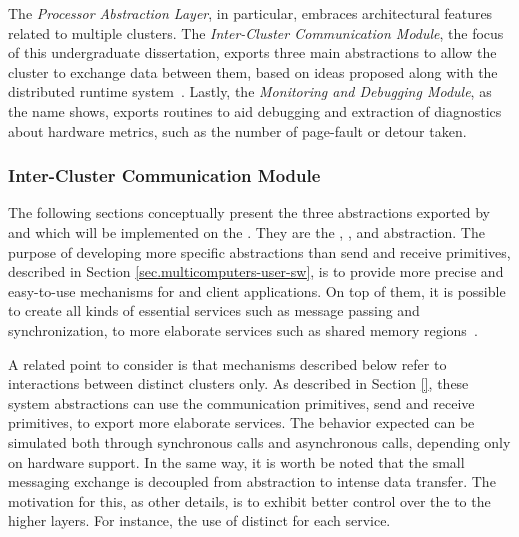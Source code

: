 		The \textit{Processor Abstraction Layer}, in particular, embraces
		architectural features related to multiple clusters.
		The \textit{Inter-Cluster Communication Module}, the focus of
		this undergraduate dissertation, exports three main abstractions to allow the
		cluster to exchange data between them, based on ideas proposed along with the
		\nodeos distributed runtime system~\cite{DeDinechin2013-1}.
		Lastly, the \textit{Monitoring and Debugging Module}, as the
		name shows, exports routines to aid debugging and extraction
		of diagnostics about hardware metrics, such as the number of
		page-fault or detour taken.

		\subsubsection{Inter-Cluster Communication Module}
		\label{sec.inter-cluster-communication}

			The following sections conceptually present the three abstractions
			exported by \hal and which will be implemented on the \mppa.
			They are the \sync, \mailbox, and \portal abstraction.
			The purpose of developing more specific abstractions than
			send and receive primitives, described in Section \ref{sec.multicomputers-user-sw},
			is to provide more precise and easy-to-use mechanisms for
			\os and client applications.
			On top of them, it is possible to create all kinds of essential
			services such as message passing and synchronization,
			to more elaborate services such as shared memory regions~\cite{penna:rmen}.

			A related point to consider is that mechanisms described below refer
			to interactions between distinct clusters only.
			As described in Section \ref{}, these system abstractions can use the
			communication primitives, \ie send and receive primitives, to export
			more elaborate services.
			The behavior expected can be simulated both through synchronous calls
			and asynchronous calls, depending only on hardware support.
			In the same way, it is worth be noted that the small messaging exchange
			is decoupled from abstraction to intense data transfer.
			The motivation for this, as other details, is to exhibit better control
			over the \qos to the higher layers.
			For instance, the use of distinct \nocs for each service.

			\label{sec.sync-abs}

